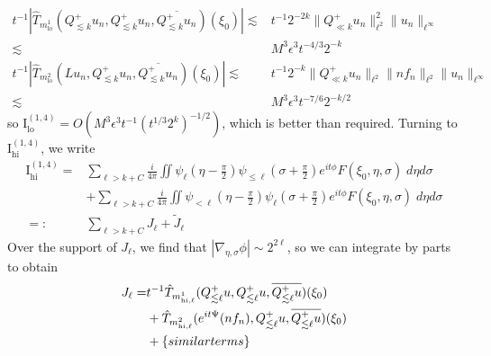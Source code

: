 \documentclass[letterpaper, reqno,final]{amsart}
\newcommand{\fhPi}{\frac{\pi}{2}}
\newcommand{\rmI}{\mathrm{I}}
\newcommand{\discrAvg}{\Psi}
\newcommand{\linProp}[1][t]{e^{i#1\discrAvg}}
\newcommand{\deles}{\nabla_{\eta,\sigma}}
\newcommand{\bigO}[1]{O\left({#1}\right)}
\newcommand{\btext}[1]{\left\{\textup{#1}\right\}}
\newcommand{\bsim}{\btext{similar terms}}
\begin{document}
\begin{equation*}\begin{split}
    t^{-1}  \left|\hat{T}_{m^1_\text{lo}}(Q^+_{\lesssim k} u_n,Q^+_{\lesssim k} u_n, \overline{Q^+_{\lesssim k}u_n})(\xi_0) \right| %
    \lesssim& t^{-1} 2^{-2k} \lVert Q^+_{\ll k} u_n \rVert_{\ell^2}^2 \lVert u_n \rVert_{\ell^\infty}\\
    \lesssim& M^3\epsilon^3 t^{-4/3} 2^{-k}\\
t^{-1} \left|\hat{T}_{m^2_\text{lo}}(L u_n,Q^+_{\lesssim k} u_n, \overline{Q^+_{\lesssim k}u_n})(\xi_0) \right| %
    \lesssim& t^{-1} 2^{-k} \lVert Q^+_{\ll k} u_n \rVert_{\ell^2}\lVert nf_n \rVert_{\ell^2} \lVert u_n \rVert_{\ell^\infty}\\
    \lesssim& M^3\epsilon^3 t^{-7/6} 2^{-k/2}
\end{split}	\end{equation*}
so $\rmI^{(1,4)}_{\text{lo}} = \bigO{M^3\epsilon^3 t^{-1} (t^{1/3} 2^k)^{-1/2}}$, which is better than required.  Turning to $\rmI^{(1,4)}_{\text{hi}}$, we write
\begin{equation*}\begin{split}
    \rmI^{(1,4)}_{\text{hi}} =& \sum_{\ell > k + C} \frac{i}{4\pi} \iint  \psi_{\ell}(\eta - \fhPi) \psi_{\leq \ell}(\sigma + \fhPi) e^{it\phi} F(\xi_0,\eta,\sigma)\;d\eta d\sigma\\
    &+ \sum_{\ell > k + C} \frac{i}{4\pi} \iint \psi_{< \ell}(\eta - \fhPi) \psi_{\ell}(\sigma + \fhPi) e^{it\phi} F(\xi_0,\eta,\sigma)\;d\eta d\sigma\\
    =:& \sum_{\ell > k + C} J_{\ell} + \tilde{J}_{\ell}
\end{split}\end{equation*}
Over the support of $J_{\ell}$, we find that $|\deles \phi| \sim 2^{2\ell}$, so we can integrate by parts to obtain
\begin{equation*}\begin{split}
    J_{\ell} =& t^{-1} \hat{T}_{m^1_{\text{hi},\ell}}(Q^+_{\lesssim \ell} u,Q^+_{\lesssim \ell} u, \overline{Q^+_{\lesssim \ell} u})(\xi_0)\\
    &+ \hat{T}_{m^2_{\text{hi},\ell}}(\linProp (n f_n),Q^+_{\lesssim \ell} u, \overline{Q^+_{\lesssim \ell} u})(\xi_0)\\
    &+ \bsim
\end{split}\end{equation*}
\end{document}
